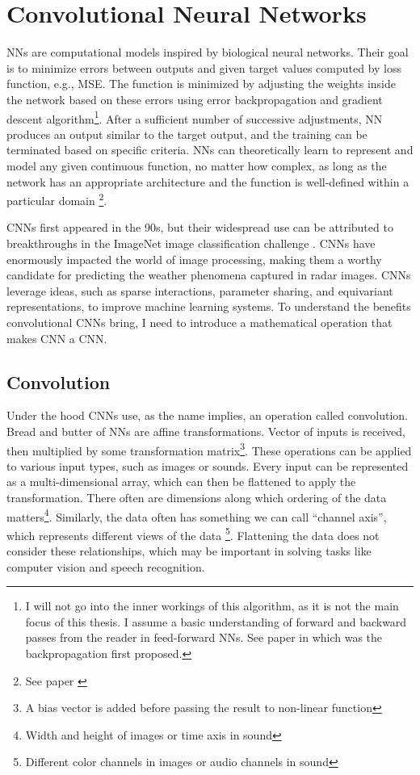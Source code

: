 \section{Convolutional Neural Networks}
\label{sub:cnn}

\glspl{NN} are computational models inspired by biological neural networks. Their goal is to minimize errors between outputs and given target values computed by loss function, e.g., \gls{MSE}. The function is minimized by adjusting the weights inside the network based on these errors using error backpropagation and gradient descent algorithm\footnote{I will not go into the inner workings of this algorithm, as it is not the main focus of this thesis. I assume a basic understanding of forward and backward passes from the reader in feed-forward \glspl{NN}. See paper \cite{backpropagation} in which was the backpropagation first proposed.}. After a sufficient number of successive adjustments, \gls{NN} produces an output similar to the target output, and the training can be terminated based on specific criteria. \glspl{NN} can theoretically learn to represent and model any given continuous function, no matter how complex, as long as the network has an appropriate architecture and the function is well-defined within a particular domain \footnote{See paper \cite{universalapproximators}}.

\glspl{CNN} first appeared in the 90s, but their widespread use can be attributed to breakthroughs in the ImageNet image classification challenge \cite{cnn}. \glspl{CNN} have enormously impacted the world of image processing, making them a worthy candidate for predicting the weather phenomena captured in radar images. \glspl{CNN} leverage ideas, such as sparse interactions, parameter sharing, and equivariant representations, to improve machine learning systems. To understand the benefits convolutional \glspl{CNN} bring, I need to introduce a mathematical operation that makes \gls{CNN} a \gls{CNN}.

\subsection{Convolution}
\label{subsec:convolution}

Under the hood \glspl{CNN} use, as the name implies, an operation called convolution. Bread and butter of \glspl{NN} are affine transformations. Vector of inputs is received, then multiplied by some transformation matrix\footnote{A bias vector is added before passing the result to non-linear function}. These operations can be applied to various input types, such as images or sounds. Every input can be represented as a multi-dimensional array, which can then be flattened to apply the transformation. There often are dimensions along which ordering of the data matters\footnote{Width and height of images or time axis in sound}. Similarly, the data often has something we can call ``channel axis'', which represents different views of the data \footnote{Different color channels in images or audio channels in sound}. Flattening the data does not consider these relationships, which may be important in solving tasks like computer vision and speech recognition. \cite[pg. 6-8]{convolutionguide}

